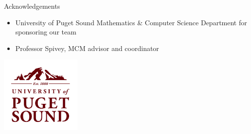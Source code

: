 \appendix

\begin{frame}{Acknowledgements}

\begin{itemize}
\item University of Puget Sound Mathematics \& Computer Science Department for sponsoring our team
\item Professor Spivey, MCM advisor and coordinator
\end{itemize}
	\vspace{-1ex}
	\begin{center}{
    \includegraphics[width= 0.3\textwidth]{img/UofPS_stacked_maroonRGB_PNG}}
    \end{center}

\end{frame}

